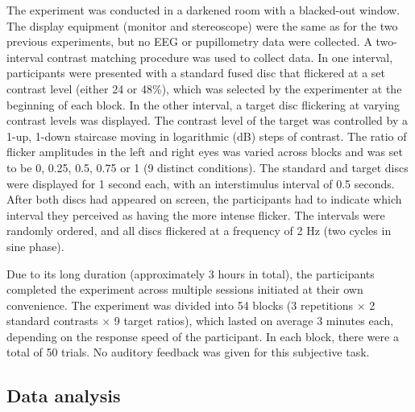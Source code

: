 \documentclass[
]{article}
\begin{document}
The experiment was conducted in a darkened room with a blacked-out window. The display equipment (monitor and stereoscope) were the same as for the two previous experiments, but no EEG or pupillometry data were collected. A two-interval contrast matching procedure was used to collect data. In one interval, participants were presented with a standard fused disc that flickered at a set contrast level (either 24 or 48\%), which was selected by the experimenter at the beginning of each block. In the other interval, a target disc flickering at varying contrast levels was displayed. The contrast level of the target was controlled by a 1-up, 1-down staircase moving in logarithmic (dB) steps of contrast. The ratio of flicker amplitudes in the left and right eyes was varied across blocks and was set to be 0, 0.25, 0.5, 0.75 or 1 (9 distinct conditions). The standard and target discs were displayed for 1 second each, with an interstimulus interval of 0.5 seconds. After both discs had appeared on screen, the participants had to indicate which interval they perceived as having the more intense flicker. The intervals were randomly ordered, and all discs flickered at a frequency of 2 Hz (two cycles in sine phase).

Due to its long duration (approximately 3 hours in total), the participants completed the experiment across multiple sessions initiated at their own convenience. The experiment was divided into 54 blocks (3 repetitions \(\times\) 2 standard contrasts \(\times\) 9 target ratios), which lasted on average 3 minutes each, depending on the response speed of the participant. In each block, there were a total of 50 trials. No auditory feedback was given for this subjective task.

\hypertarget{data-analysis}{%
\subsection{Data analysis}\label{data-analysis}}
\end{document}
